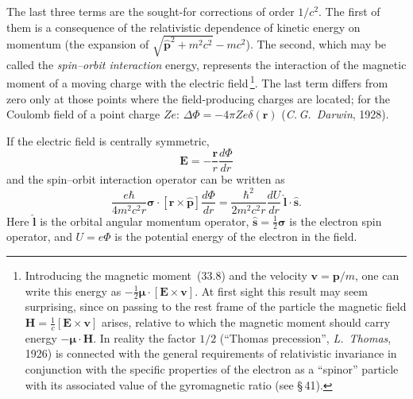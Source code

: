 The last three terms are the sought-for corrections of order $1/c^2$. The first of them is a consequence of the relativistic dependence of kinetic energy on momentum (the expansion of $\sqrt{\widehat{\mathbf{p}}^2 + m^2c^2} - mc^2$). The second, which may be called the \emph{spin--orbit interaction} energy, represents the interaction of the magnetic moment of a moving charge with the electric field\,\footnote{Introducing the magnetic moment~(33.8) and the velocity $\mathbf{v} = \mathbf{p}/m$, one can write this energy as $-\frac{1}{2}\boldsymbol{\mu}\cdot[\mathbf{E}\times\mathbf{v}]$. At first sight this result may seem surprising, since on passing to the rest frame of the particle the magnetic field $\mathbf{H} = \frac{1}{c}[\mathbf{E}\times\mathbf{v}]$ arises, relative to which the magnetic moment should carry energy $-\boldsymbol{\mu}\cdot\mathbf{H}$. In reality the factor $1/2$ (``Thomas precession'', \emph{L.~Thomas}, 1926) is connected with the general requirements of relativistic invariance in conjunction with the specific properties of the electron as a ``spinor'' particle with its associated value of the gyromagnetic ratio (see \S\,41).}. The last term differs from zero only at those points where the field-producing charges are located; for the Coulomb field of a point charge $Ze$: $\Delta\Phi = -4\pi Ze\delta(\mathbf{r})$ (\emph{C.\,G.~Darwin}, 1928).

If the electric field is centrally symmetric,
\[
\mathbf{E} = -\frac{\mathbf{r}}{r}\frac{d\Phi}{dr}
\]
and the spin--orbit interaction operator can be written as
\begin{equation}
\frac{e\hbar}{4m^2c^2r}\boldsymbol{\sigma}\cdot[\mathbf{r}\times\widehat{\mathbf{p}}]\frac{d\Phi}{dr} = \frac{\hbar^2}{2m^2c^2r}\frac{dU}{dr}\,\widehat{\mathbf{l}}\cdot\widehat{\mathbf{s}}.
\tag{33.13}
\end{equation}
Here $\widehat{\mathbf{l}}$ is the orbital angular momentum operator, $\widehat{\mathbf{s}} = \frac{1}{2}\boldsymbol{\sigma}$ is the electron spin operator, and $U = e\Phi$ is the potential energy of the electron in the field.
